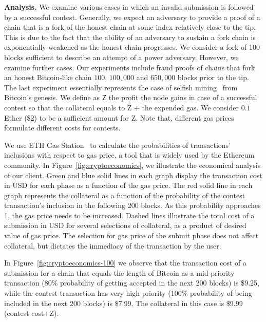 \noindent \textbf{Analysis.} We examine various cases in which an invalid
submission is followed by a successful contest. Generally, we expect an
adversary to provide a proof of a chain that is a fork of the honest chain at
some index relatively close to the tip. This is due to the fact that the
ability of an adversary to sustain a fork chain is exponentially weakened as
the honest chain progresses. We consider a fork of 100 blocks sufficient to
describe an attempt of a power adversary. However, we examine further cases.
Our experiments include fraud proofs of chains that fork an honest Bitcoin-like
chain $100$, $100{,}000$ and $650{,}000$ blocks prior to the tip. The last
experiment essentially represents the case of selfish mining~\cite{selfish}
from Bitcoin's genesis. We define as $\textsf{Z}$ the profit the node gains in
case of a successful contest so that the collateral equals to \textsf{Z} + the
expended gas. We consider $0.1$ Ether (\$2) to be a sufficient amount for
\textsf{Z}. Note that, different gas prices formulate different costs for
contests.

We use ETH Gas Station~\cite{eth-gas-station} to calculate the probabilities of
transactions' inclusions with respect to gas price, a tool that is widely used
by the Ethereum community. In Figure~\ref{fig:cryptoeconomics}, we illustrate
the economical analysis of our client. Green and blue solid lines in each graph
display the transaction cost in USD for each phase as a function of the gas
price. The red solid line in each graph represents the collateral as a function
of the probability of the contest transaction's inclusion in the following 200
blocks. As this probability approaches 1, the gas price needs to be increased.
Dashed lines illustrate the total cost of a submission in USD for several
selections of collateral, as a product of desired value of gas price. The
selection for gas price of the submit phase does not affect collateral, but
dictates the immediacy of the transaction by the user.

In Figure~\ref{fig:cryptoeconomics-100} we observe that the transaction cost of
a submission for a chain that equals the length of Bitcoin as a mid priority
transaction (80\% probability of getting accepted in the next 200 blocks) is
\$9.25, while the contest transaction has very high priority (100\% probability
of being included in the next 200 blocks) is \$7.99. The collateral in this
case is \$9.99 (contest cost+\textsf{Z}).

